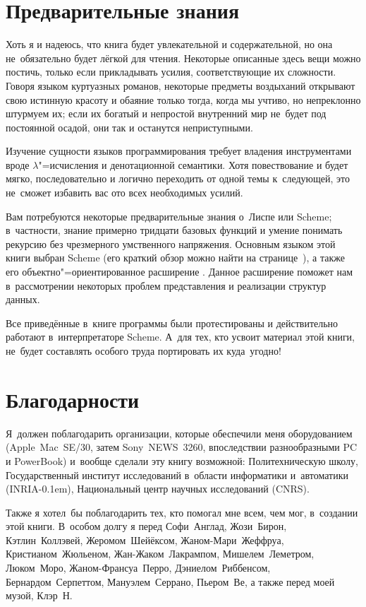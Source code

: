 \section*{Предварительные знания}\label{pref/sect:prereqs}

Хоть я и надеюсь, что книга будет увлекательной и содержательной, но она
не~обязательно будет лёгкой для чтения. Некоторые описанные здесь вещи можно
постичь, только если прикладывать усилия, соответствующие их сложности. Говоря
языком куртуазных романов, некоторые предметы воздыханий открывают свою истинную
красоту и обаяние только тогда, когда мы учтиво, но непреклонно штурмуем их;
если их богатый и непростой внутренний мир не~будет под постоянной осадой, они
так и останутся неприступными.

Изучение сущности языков программирования требует владения инструментами вроде
$\lambda$"=исчисления и денотационной семантики. Хотя повествование и будет
мягко, последовательно и логично переходить от одной темы к~следующей, это
не~сможет избавить вас ото всех необходимых усилий.

Вам потребуются некоторые предварительные знания о~Лиспе или Scheme;
в~частности, знание примерно тридцати базовых функций и умение понимать рекурсию
без чрезмерного умственного напряжения. Основным языком этой книги выбран Scheme
(его краткий обзор можно найти на странице~\pageref{pref/sect:scheme-summary}),
а также его объектно"=ориентированное расширение \Meroon. Данное расширение
поможет нам в~рассмотрении некоторых проблем представления и реализации структур
данных.

Все приведённые в~книге программы были протестированы и действительно работают
в~интерпретаторе Scheme. А~для тех, кто усвоит материал этой книги, не~будет
составлять особого труда портировать их куда~угодно!


\section*{Благодарности}\label{pref/sect:thanks}

Я~должен поблагодарить организации, которые обеспечили меня оборудованием
(Apple~Mac~SE/30, затем Sony~NEWS~3260, впоследствии разнообразными PC и
PowerBook) и~вообще сделали эту книгу возможной: Политехническую школу,
Государственный институт исследований в~области информатики и~автоматики
(INRIA\kern-0.1em), Национальный центр научных исследований (CNRS).

Также я хотел~бы поблагодарить тех, кто помогал мне всем, чем мог, в~создании
этой книги. В~особом долгу я перед Софи~Англад, Жози~Бирон, Кэтлин~Коллэвей,
Жеромом~Шейёксом, Жаном-Мари~Жеффруа, Кристианом~Жюльеном, Жан-Жаком~Лакрампом,
Мишелем~Леметром, Люком~Моро, Жаном-Франсуа~Перро, Дэниелом~Риббенсом,
Бернардом~Серпеттом, Мануэлем~Серрано, Пьером~Ве, а также перед моей музой,
Клэр~Н.{\fnstyle{\RaggedRight}}

